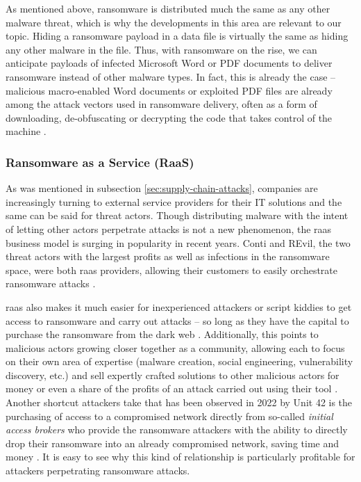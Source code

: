 As mentioned above, ransomware is distributed much the same as any other malware threat, which is why the developments
in this area are relevant to our topic. Hiding a ransomware payload in a data file is virtually the same as hiding
any other malware in the file. Thus, with ransomware on the rise, we can anticipate payloads of infected Microsoft
Word or PDF documents to deliver ransomware instead of other malware types. In fact, this is already the case -- 
malicious macro-enabled Word documents or exploited PDF files are already among the attack vectors used in ransomware
delivery, often as a form of downloading, de-obfuscating or decrypting the code that takes control of the machine
\cite[p.~8-10]{ransomware-book}.

\subsubsection{Ransomware as a Service (RaaS)}
As was mentioned in subsection \ref{sec:supply-chain-attacks}, companies are increasingly turning to external service providers 
for their IT solutions and the same can be said for threat actors. Though distributing malware with the intent of
letting other actors perpetrate attacks is not a new phenomenon, the \acrfull{raas} business model is surging in
popularity in recent years. Conti and REvil, the two threat actors with the largest profits as well as infections in the ransomware 
space, were both \acrshort{raas} providers, allowing their customers to easily orchestrate ransomware attacks
\cite{enisa_threat_landscape, unit42-ransomware}.

\acrshort{raas} also makes it much easier for inexperienced attackers or script kiddies to get access to ransomware
and carry out attacks -- so long as they have the capital to purchase the ransomware from the dark web
\cite{social-engineering-ransomware-vector}. Additionally, this points to malicious actors growing closer together
as a community, allowing each to focus on their own area of expertise (malware creation, social engineering,
vulnerability discovery, etc.) and sell expertly crafted solutions to other malicious actors for money or even 
a share of the profits of an attack carried out using their tool \cite{enisa_threat_landscape}.
Another shortcut attackers take that has been observed in 2022 by Unit 42 is the purchasing of access to a compromised 
network directly from so-called \emph{initial access brokers} who provide the ransomware attackers with the ability to
directly drop their ransomware into an already compromised network, saving time and money \cite{unit42-ransomware}.
It is easy to see why this kind of relationship is particularly profitable for attackers perpetrating ransomware
attacks. 

